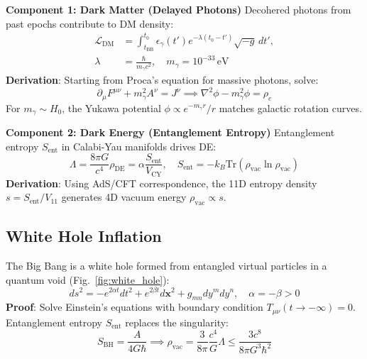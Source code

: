\documentclass[12pt, a4paper]{article}
\begin{document}
\textbf{Component 1: Dark Matter (Delayed Photons)}  
Decohered photons from past epochs contribute to DM density:  
\begin{align}  
\mathcal{L}_{\text{DM}} &= \int_{t_{\text{BB}}}^{t_0} \epsilon_\gamma(t') e^{-\lambda(t_0 - t')} \sqrt{-g} \, dt', \\  
\lambda &= \frac{\hbar}{m_\gamma c^2}, \quad m_\gamma = 10^{-33} \, \text{eV}  
\label{eq:dm_lagrangian}  
\end{align}  
\textbf{Derivation}: Starting from Proca's equation for massive photons, solve:  
\begin{equation}  
\partial_\mu F^{\mu\nu} + m_\gamma^2 A^\nu = J^\nu \implies \nabla^2 \phi - m_\gamma^2 \phi = \rho_e  
\label{eq:proca}  
\end{equation}  
For \( m_\gamma \sim H_0 \), the Yukawa potential \( \phi \propto e^{-m_\gamma r}/r \) matches galactic rotation curves.  

\textbf{Component 2: Dark Energy (Entanglement Entropy)}  
Entanglement entropy \( S_{\text{ent}} \) in Calabi-Yau manifolds drives DE:  
\begin{equation}  
\Lambda = \frac{8\pi G}{c^4} \rho_{\text{DE}} = \alpha \frac{S_{\text{ent}}}{V_{\text{CY}}}, \quad S_{\text{ent}} = -k_B \text{Tr}(\rho_{\text{vac}} \ln \rho_{\text{vac}})  
\label{eq:de}  
\end{equation}  
\textbf{Derivation}: Using AdS/CFT correspondence, the 11D entropy density \( s = S_{\text{ent}}/V_{11} \) generates 4D vacuum energy \( \rho_{\text{vac}} \propto s \).  

\subsection{White Hole Inflation}  
\label{subsec:inflation}  
The Big Bang is a white hole formed from entangled virtual particles in a quantum void (Fig.~\ref{fig:white_hole}):  
\begin{equation}  
ds^2 = -e^{2\alpha t} dt^2 + e^{2\beta t} d\bm{x}^2 + g_{mn} dy^m dy^n, \quad \alpha = -\beta > 0  
\label{eq:metric}  
\end{equation}  
\textbf{Proof}: Solve Einstein’s equations with boundary condition \( T_{\mu\nu}(t \to -\infty) = 0 \). Entanglement entropy \( S_{\text{ent}} \) replaces the singularity:  
\begin{equation}  
S_{\text{BH}} = \frac{A}{4G\hbar} \implies \rho_{\text{vac}} = \frac{3}{8\pi} \frac{c^4}{G} \Lambda \leq \frac{3c^8}{8\pi G^3 \hbar^2}  
\label{eq:entropy_bound}  
\end{equation}  
\end{document}

